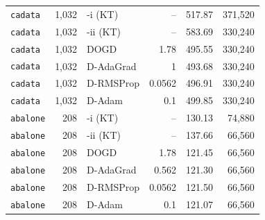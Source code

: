 \begin{table}[tbp]
\begin{tabular}{lrlrrr}
        \texttt{cadata} & 1,032 & \algname{}-i (KT)  & --     & 517.87 & 371,520 \\
        \texttt{cadata} & 1,032 & \algname{}-ii (KT) & --     & 583.69 & 330,240 \\
        \texttt{cadata} & 1,032 & DOGD                 & 1.78   & 495.55 & 330,240 \\
        \texttt{cadata} & 1,032 & D-AdaGrad            & 1      & 493.68 & 330,240 \\
        \texttt{cadata} & 1,032 & D-RMSProp            & 0.0562 & 496.91 & 330,240 \\
        \texttt{cadata} & 1,032 & D-Adam               & 0.1    & 499.85 & 330,240 \\
        \hline
        \texttt{abalone} & 208 & \algname{}-i (KT)  & --     & 130.13 & 74,880 \\
        \texttt{abalone} & 208 & \algname{}-ii (KT) & --     & 137.66 & 66,560 \\
        \texttt{abalone} & 208 & DOGD                 & 1.78   & 121.45 & 66,560 \\
        \texttt{abalone} & 208 & D-AdaGrad            & 0.562  & 121.30 & 66,560 \\
        \texttt{abalone} & 208 & D-RMSProp            & 0.0562 & 121.50 & 66,560 \\
        \texttt{abalone} & 208 & D-Adam               & 0.1    & 121.07 & 66,560 \\
        \hline
    \end{tabular}
\end{table}

